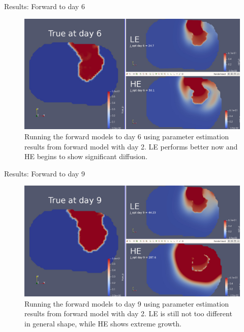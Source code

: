 \documentclass{beamer}
\begin{document}
\begin{frame}{Results: Forward to day 6}
	\begin{figure}
    	\centering
    	\includegraphics[width=\textwidth]{opt_day6.jpg}    	
    	\caption{Running the forward models to day 6 using parameter estimation results from forward model with day 2. LE performs better now and HE begins to show significant diffusion.}
    	\end{figure}	
\end{frame}

\begin{frame}{Results: Forward to day 9}
	\begin{figure}
    	\centering
    	\includegraphics[width=\textwidth]{opt_day9.jpg}    	
    	\caption{Running the forward models to day 9 using parameter estimation results from forward model with day 2. LE is still not too different in general shape, while HE shows extreme growth.}
    	\end{figure}	
\end{frame}
\end{document}
